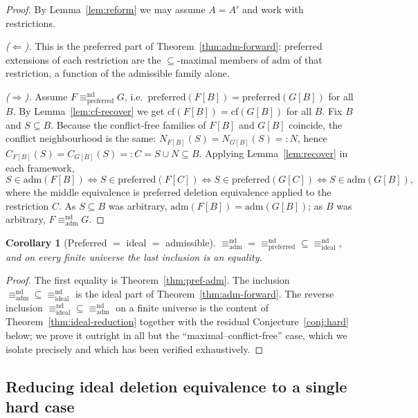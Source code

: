 \documentclass{amsart}
\newtheorem{corollary}[theorem]{Corollary}
\theoremstyle{remark}
\begin{document}
\begin{proof}
By Lemma~\ref{lem:reform} we may assume $A=A'$ and work with restrictions.

\emph{($\Leftarrow$).}  This is the preferred part of
Theorem~\ref{thm:adm-forward}: preferred extensions of each restriction are the
$\subseteq$-maximal members of $\mathrm{adm}$ of that restriction, a function of
the admissible family alone.

\emph{($\Rightarrow$).}  Assume
$F\equiv^{\mathrm{nd}}_{\mathrm{preferred}}G$, i.e.\
$\mathrm{preferred}(F[B])=\mathrm{preferred}(G[B])$ for all $B$.  By
Lemma~\ref{lem:cf-recover} we get $\mathrm{cf}(F[B])=\mathrm{cf}(G[B])$ for all
$B$.  Fix $B$ and $S\subseteq B$.  Because the conflict-free families of
$F[B]$ and $G[B]$ coincide, the conflict neighbourhood is the same:
$N_{F[B]}(S)=N_{G[B]}(S)=:N$, hence $C_{F[B]}(S)=C_{G[B]}(S)=:C=S\cup N\subseteq
B$.  Applying Lemma~\ref{lem:recover} in each framework,
\[
S\in\mathrm{adm}(F[B])\iff S\in\mathrm{preferred}(F[C])
\iff S\in\mathrm{preferred}(G[C])\iff S\in\mathrm{adm}(G[B]),
\]
where the middle equivalence is preferred deletion equivalence applied to the
restriction $C$.  As $S\subseteq B$ was arbitrary,
$\mathrm{adm}(F[B])=\mathrm{adm}(G[B])$; as $B$ was arbitrary,
$F\equiv^{\mathrm{nd}}_{\mathrm{adm}}G$.
\end{proof}

\begin{corollary}[Preferred $=$ ideal $=$ admissible]\label{cor:pref-ideal}
$\equiv^{\mathrm{nd}}_{\mathrm{adm}}=\equiv^{\mathrm{nd}}_{\mathrm{preferred}}
\subseteq\equiv^{\mathrm{nd}}_{\mathrm{ideal}}$, and on every finite universe the
last inclusion is an equality.
\end{corollary}

\begin{proof}
The first equality is Theorem~\ref{thm:pref-adm}.  The inclusion
$\equiv^{\mathrm{nd}}_{\mathrm{adm}}\subseteq
\equiv^{\mathrm{nd}}_{\mathrm{ideal}}$ is the ideal part of
Theorem~\ref{thm:adm-forward}.  The reverse inclusion
$\equiv^{\mathrm{nd}}_{\mathrm{ideal}}\subseteq
\equiv^{\mathrm{nd}}_{\mathrm{adm}}$ on a finite universe is the content of
Theorem~\ref{thm:ideal-reduction} together with the residual
Conjecture~\ref{conj:hard} below; we prove it outright in all but the
``maximal--conflict-free'' case, which we isolate precisely and which has been
verified exhaustively.
\end{proof}

\subsection{Reducing ideal deletion equivalence to a single hard case}
\label{subsec:ideal-reduce}
\end{document}
